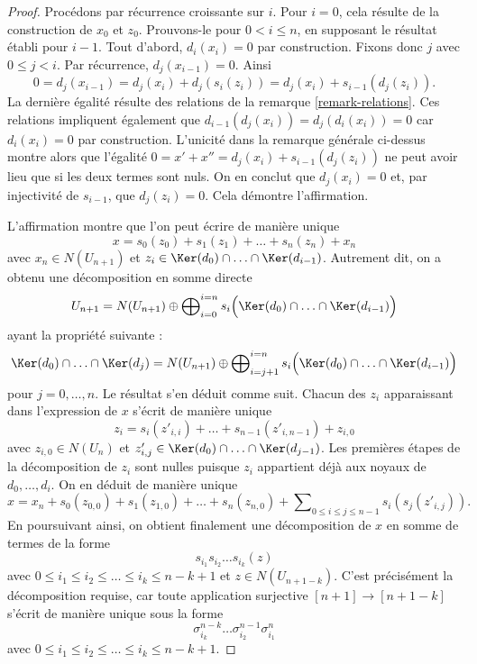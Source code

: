 \begin{proof}
\medskip\noindent
Procédons par récurrence croissante sur $i$. Pour $i = 0$, cela résulte
de la construction de $x_0$ et $z_0$. Prouvons-le pour
$0 < i \leq n$, en supposant le résultat établi pour $i - 1$. Tout d'abord,
$d_i(x_i) = 0$ par construction. Fixons donc $j$ avec $0 \leq j < i$.
Par récurrence, $d_j(x_{i - 1}) = 0$. Ainsi
$$
0 = d_j(x_{i - 1})
= d_j(x_i) + d_j(s_i(z_i))
= d_j(x_i) + s_{i - 1}(d_j(z_i)).
$$
La dernière égalité résulte des relations de la remarque
\ref{remark-relations}. Ces relations impliquent également que
$d_{i - 1}(d_j(x_i)) = d_j(d_i(x_i)) = 0$
car $d_i(x_i)= 0$ par construction. L'unicité dans la remarque générale
ci-dessus montre alors que l'égalité
$0 = x' + x'' = d_j(x_i) + s_{i - 1}(d_j(z_i))$
ne peut avoir lieu que si les deux termes sont nuls. On en conclut que
$d_j(x_i) = 0$ et, par injectivité de $s_{i - 1}$, que
$d_j(z_i) = 0$. Cela démontre l'affirmation.

\medskip\noindent
L'affirmation montre que l'on peut écrire de manière unique
$$
x = s_0(z_0) + s_1(z_1) + \ldots + s_n(z_n) + x_n
$$
avec $x_n \in N(U_{n + 1})$ et
$z_i \in \Ker(d_0) \cap \ldots \cap \Ker(d_{i - 1})$.
Autrement dit, on a obtenu une décomposition en somme directe
$$
U_{n + 1}
=
N(U_{n + 1})
\oplus
\bigoplus\nolimits_{i = 0}^{i = n}
s_i\Big(\Ker(d_0) \cap \ldots \cap \Ker(d_{i - 1})\Big)
$$
ayant la propriété suivante :
$$
\Ker(d_0) \cap \ldots \cap \Ker(d_j)
=
N(U_{n + 1}) \oplus
\bigoplus\nolimits_{i = j + 1}^{i = n}
s_i\Big(\Ker(d_0) \cap \ldots \cap \Ker(d_{i - 1})\Big)
$$
pour $j = 0, \ldots, n$. Le résultat s'en déduit comme suit. Chacun des
$z_i$ apparaissant dans l'expression de $x$ s'écrit de manière unique
$$
z_i = s_i(z'_{i, i}) + \ldots + s_{n - 1}(z'_{i, n - 1}) + z_{i, 0}
$$
avec $z_{i, 0} \in N(U_n)$ et
$z'_{i, j} \in \Ker(d_0) \cap \ldots \cap \Ker(d_{j - 1})$.
Les premières étapes de la décomposition de $z_i$ sont nulles puisque
$z_i$ appartient déjà aux noyaux de $d_0, \ldots, d_i$. On en déduit de
manière unique
$$
x = x_n + s_0(z_{0, 0}) + s_1(z_{1, 0}) + \ldots + s_n(z_{n, 0}) +
\sum\nolimits_{0 \leq i \leq j \leq n - 1} s_i(s_j(z'_{i, j})).
$$
En poursuivant ainsi, on obtient finalement une décomposition de $x$ en
somme de termes de la forme
$$
s_{i_1} s_{i_2} \ldots s_{i_k} (z)
$$
avec $0 \leq i_1 \leq i_2 \leq \ldots \leq i_k \leq n - k + 1$ et
$z \in N(U_{n + 1 - k})$. C'est précisément la décomposition requise,
car toute application surjective $[n + 1] \to [n + 1 - k]$ s'écrit de
manière unique sous la forme
$$
\sigma^{n - k}_{i_k} \ldots \sigma^{n - 1}_{i_2} \sigma^n_{i_1}
$$
avec $0 \leq i_1 \leq i_2 \leq \ldots \leq i_k \leq n - k + 1$.
\end{proof}

